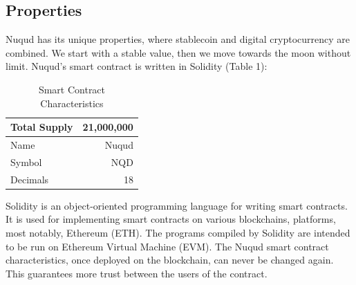 \documentclass[12pt]{article}
\begin{document}
\subsection{Properties}
Nuqud has its unique properties, where stablecoin and digital cryptocurrency are combined.  We start with a stable value, then we move towards the moon without limit. Nuqud's smart contract is written in Solidity \cite{nqd2021etherscan} (Table 1):
\begin{table}[!h]
  \begin{center}
    \label{tab:t1}
    \begin{tabular}{|l|r|}
      \hline
      Total Supply &  21,000,000\\
      \hline
      Name  &  Nuqud\\
      \hline
      Symbol &  NQD\\
      \hline
      Decimals & 18\\
      \hline
    \end{tabular}
    \caption{Smart Contract Characteristics}
  \end{center}
\end{table}

Solidity is an object-oriented programming language for writing smart contracts. It is used for implementing smart contracts on various blockchains, platforms, most notably, Ethereum (ETH). The programs compiled by Solidity are intended to be run on Ethereum Virtual Machine (EVM). The Nuqud smart contract characteristics, once deployed on the blockchain, can never be changed again. This guarantees more trust between the users of the contract.
\end{document}
